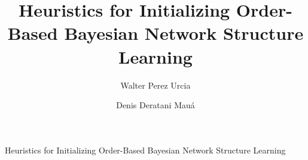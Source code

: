 {Heuristics for Initializing Order-Based Bayesian Network Structure Learning}

\title{Heuristics for Initializing Order-Based Bayesian Network Structure Learning}

\author{Walter Perez Urcia \and Denis Deratani Mauá}


